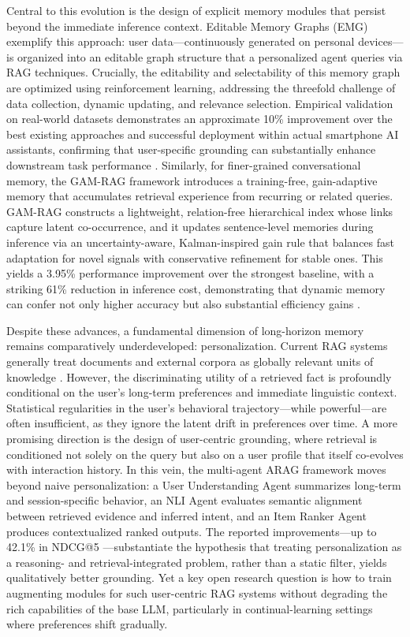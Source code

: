 \documentclass[11pt,a4paper]{article}
\begin{document}
Central to this evolution is the design of explicit memory modules that persist beyond the immediate inference context. Editable Memory Graphs (EMG) exemplify this approach: user data---continuously generated on personal devices---is organized into an editable graph structure that a personalized agent queries via RAG techniques. Crucially, the editability and selectability of this memory graph are optimized using reinforcement learning, addressing the threefold challenge of data collection, dynamic updating, and relevance selection. Empirical validation on real-world datasets demonstrates an approximate 10\% improvement over the best existing approaches and successful deployment within actual smartphone AI assistants, confirming that user-specific grounding can substantially enhance downstream task performance \cite{arxiv:2409.19401v1}. Similarly, for finer-grained conversational memory, the GAM-RAG framework introduces a training-free, gain-adaptive memory that accumulates retrieval experience from recurring or related queries. GAM-RAG constructs a lightweight, relation-free hierarchical index whose links capture latent co-occurrence, and it updates sentence-level memories during inference via an uncertainty-aware, Kalman-inspired gain rule that balances fast adaptation for novel signals with conservative refinement for stable ones. This yields a 3.95\% performance improvement over the strongest baseline, with a striking 61\% reduction in inference cost, demonstrating that dynamic memory can confer not only higher accuracy but also substantial efficiency gains \cite{arxiv:2603.01783v1}.

Despite these advances, a fundamental dimension of long-horizon memory remains comparatively underdeveloped: personalization. Current RAG systems generally treat documents and external corpora as globally relevant units of knowledge \cite{arxiv:2503.10677v3}. However, the discriminating utility of a retrieved fact is profoundly conditional on the user's long-term preferences and immediate linguistic context. Statistical regularities in the user's behavioral trajectory---while powerful---are often insufficient, as they ignore the latent drift in preferences over time. A more promising direction is the design of user-centric grounding, where retrieval is conditioned not solely on the query but also on a user profile that itself co-evolves with interaction history. In this vein, the multi-agent ARAG framework moves beyond naive personalization: a User Understanding Agent summarizes long-term and session-specific behavior, an NLI Agent evaluates semantic alignment between retrieved evidence and inferred intent, and an Item Ranker Agent produces contextualized ranked outputs. The reported improvements---up to 42.1\% in NDCG@5 \cite{arxiv:2506.21931v2}---substantiate the hypothesis that treating personalization as a reasoning- and retrieval-integrated problem, rather than a static filter, yields qualitatively better grounding. Yet a key open research question is how to train augmenting modules for such user-centric RAG systems without degrading the rich capabilities of the base LLM, particularly in continual-learning settings where preferences shift gradually.
\end{document}
